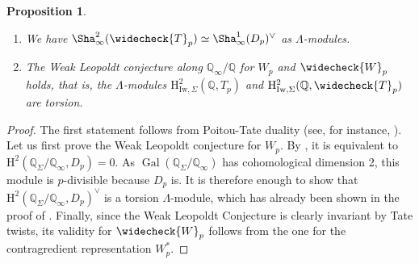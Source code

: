 \documentclass[12pt]{amsart}
\newcommand\bQ{\mathbb{Q}}
\newcommand\Zp{{\mathbb{Z}_p}}
\newcommand\Qp{{\mathbb{Q}_p}}
\DeclareMathOperator{\Gal}{Gal}
\DeclareMathOperator{\Hom}{Hom}
\newcommand{\HH}{\mathrm{H}}
\newcommand{\Iw}{\mathrm{Iw}}
\theoremstyle{defstyle}
\theoremstyle{thmstyle}
\newtheorem{proposition}[subsubsection]{Proposition}
\begin{document}
\begin{proposition}\label{prop:conjecture_leopoldt_faible}\hspace{2em}
	\begin{enumerate}
		\item  We have $\Sha_\infty^2(\widecheck{T}_p)\simeq \Sha_\infty^1(D_p)^\vee$ as $\Lambda$-modules.
		\item The Weak Leopoldt conjecture along $\bQ_\infty/\bQ$ for $W_p$ and $\widecheck{W}_p$ holds, that is, the $\Lambda$-modules $\HH^2_{\Iw,\Sigma}(\bQ,T_p)$ and $\HH^2_{\Iw,\Sigma}(\bQ,\widecheck{T}_p)$ are torsion.
	\end{enumerate} 
\end{proposition}
\begin{proof}
The first statement follows from Poitou-Tate duality (see, for instance, \cite[Thm. 4.10.(a)]{milneADT}). Let us first prove the Weak Leopoldt conjecture for $W_p$. By \cite[Prop. 1.3.2]{perrin1995fonctions}, it is equivalent to $\HH^2(\bQ_\Sigma/\bQ_\infty,D_p)=0$. As $\Gal(\bQ_\Sigma/\bQ_\infty)$ has cohomological dimension 2, this module is $p$-divisible because $D_p$ is. It is therefore enough to show that $\HH^2(\bQ_\Sigma/\bQ_\infty,D_p)^\vee$ is a torsion $\Lambda$-module, which has already been shown in the proof of \cite[Prop. 2.5.5]{maks}. Finally, since the Weak Leopoldt Conjecture is clearly invariant by Tate twists, its validity for $\widecheck{W}_p$ follows from the one for the contragredient representation $W_p^*$. 
\end{proof}
\end{document}
